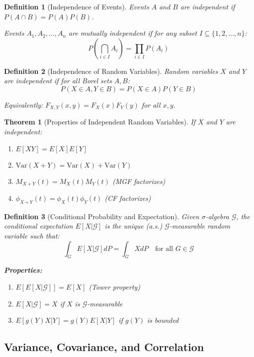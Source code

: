 \documentclass[12pt,a4paper]{article}
\newtheorem{theorem}{Theorem}[section]
\newtheorem{definition}{Definition}[section]
\theoremstyle{remark}
\begin{document}
\begin{definition}[Independence of Events]
Events $A$ and $B$ are independent if $P(A \cap B) = P(A)P(B)$.

Events $A_1, A_2, \ldots, A_n$ are mutually independent if for any subset $I \subseteq \{1,2,\ldots,n\}$:
$$P\left(\bigcap_{i \in I} A_i\right) = \prod_{i \in I} P(A_i)$$
\end{definition}

\begin{definition}[Independence of Random Variables]
Random variables $X$ and $Y$ are independent if for all Borel sets $A, B$:
$$P(X \in A, Y \in B) = P(X \in A)P(Y \in B)$$

Equivalently: $F_{X,Y}(x,y) = F_X(x)F_Y(y)$ for all $x,y$.
\end{definition}

\begin{theorem}[Properties of Independent Random Variables]
If $X$ and $Y$ are independent:
\begin{enumerate}
\item $E[XY] = E[X]E[Y]$
\item $\text{Var}(X + Y) = \text{Var}(X) + \text{Var}(Y)$
\item $M_{X+Y}(t) = M_X(t)M_Y(t)$ (MGF factorizes)
\item $\phi_{X+Y}(t) = \phi_X(t)\phi_Y(t)$ (CF factorizes)
\end{enumerate}
\end{theorem}

\begin{definition}[Conditional Probability and Expectation]
Given $\sigma$-algebra $\mathcal{G}$, the conditional expectation $E[X|\mathcal{G}]$ is the unique (a.s.) $\mathcal{G}$-measurable random variable such that:
$$\int_G E[X|\mathcal{G}] dP = \int_G X dP \quad \text{for all } G \in \mathcal{G}$$

\textbf{Properties:}
\begin{enumerate}
\item $E[E[X|\mathcal{G}]] = E[X]$ (Tower property)
\item $E[X|\mathcal{G}] = X$ if $X$ is $\mathcal{G}$-measurable
\item $E[g(Y)X|Y] = g(Y)E[X|Y]$ if $g(Y)$ is bounded
\end{enumerate}
\end{definition}

\subsection{Variance, Covariance, and Correlation}
\end{document}
